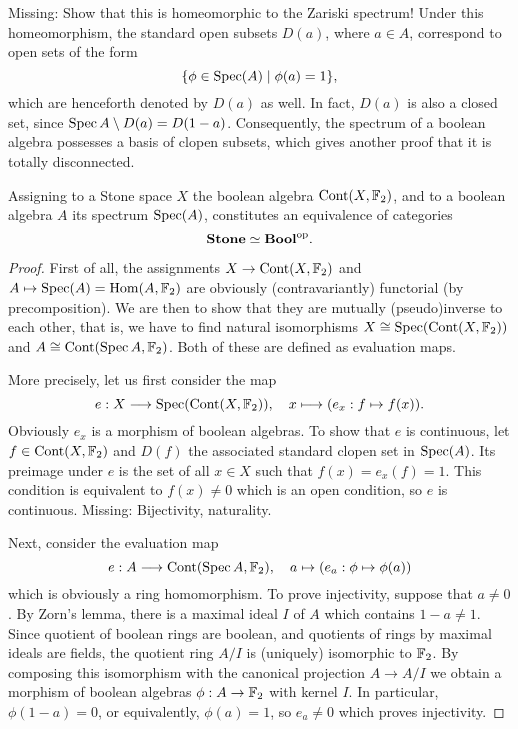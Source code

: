 \documentclass{notes}
\begin{document}
{\begin{example}
  Missing: Show that this is homeomorphic to the Zariski spectrum!
  Under this homeomorphism, the standard open subsets \(D(a)\), where \(a\in A\), correspond to open sets of the form
  \[\{\phi\in\operatorname{Spec}(A) \mid \phi(a)=1\},\]
  which are henceforth denoted by \(D(a)\) as well.
  In fact, \(D(a)\) is also a closed set, since \(\operatorname{Spec} A\setminus D(a)=D(1-a)\).
  Consequently, the spectrum of a boolean algebra possesses a basis of clopen subsets, which gives another proof that it is totally disconnected.
\end{example}

\begin{thm}
  Assigning to a Stone space \(X\) the boolean algebra \({\rm Cont}(X,{\mathbb{F}}_2)\), and to a boolean algebra \(A\) its spectrum \(\operatorname{Spec}(A)\), constitutes an equivalence of categories
  \[
    \mathbf{Stone} \simeq \mathbf{Bool}^{\rm op}.
  \]
\end{thm}
\begin{proof}
  First of all, the assignments \(X\to{\rm Cont}(X,{\mathbb{F}}_2)\) and \(A\mapsto\operatorname{Spec}(A)=\mathrm{Hom}(A,{\mathbb{F}}_2)\) are obviously (contravariantly) functorial (by precomposition).
  We are then to show that they are mutually (pseudo)inverse to each other, that is, we have to find natural isomorphisms \(X\cong\operatorname{Spec}({\rm Cont}(X,{\mathbb{F}}_2))\) and \(A\cong{\rm Cont}(\operatorname{Spec} A,{\mathbb{F}}_2)\).
  Both of these are defined as evaluation maps.

  More precisely, let us first consider the map
  \[e:X \longrightarrow \operatorname{Spec}({\rm Cont}(X,{\mathbb{F}}_2)), \quad x \longmapsto (e_x:f \mapsto f(x)).\]
  Obviously \(e_x\) is a morphism of boolean algebras.
  To show that \(e\) is continuous, let \(f\in {\rm Cont}(X,{\mathbb{F}}_2)\) and \(D(f)\) the associated standard clopen set in \(\operatorname{Spec}(A)\).
  Its preimage under \(e\) is the set of all \(x\in X\) such that \(f(x)=e_x(f)=1\).
  This condition is equivalent to \(f(x)\neq 0\) which is an open condition, so \(e\) is continuous.
  Missing: Bijectivity, naturality.

  Next, consider the evaluation map
  \[e:A \longrightarrow  {\rm Cont}(\operatorname{Spec} A,{\mathbb{F}}_2),\quad a\mapsto (e_a : \phi\mapsto \phi(a))\]
  which is obviously a ring homomorphism.
  To prove injectivity, suppose that \(a\neq 0\).
  By Zorn's lemma, there is a maximal ideal \(I\) of \(A\) which contains \(1-a\neq 1\).
  Since quotient of boolean rings are boolean, and quotients of rings by maximal ideals are fields, the quotient ring \(A/I\) is (uniquely) isomorphic to \({\mathbb{F}}_2\).
  By composing this isomorphism with the canonical projection \(A\to A/I\) we obtain a morphism of boolean algebras \(\phi:A\to {\mathbb{F}}_2\) with kernel \(I\).
  In particular, \(\phi(1-a)=0\), or equivalently, \(\phi(a)=1\), so \(e_a\neq 0\) which proves injectivity.


\end{proof}}
\end{document}

